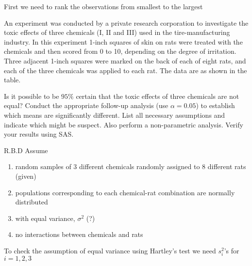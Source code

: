 \documentclass{article}
\begin{document}
First we need to rank the observations from smallest to the largest

An experiment was conducted by a private research corporation to investigate the toxic
effects of three chemicals (I, II and III) used in the tire-manufacturing industry. In this
experiment 1-inch squares of skin on rats were treated with the chemicals and then scored
from 0 to 10, depending on the degree of irritation. Three adjacent 1-inch squares were
marked on the back of each of eight rats, and each of the three chemicals was applied to
each rat. The data are as shown in the table. 

Is it possible to be $95\%$ certain that the toxic effects of three chemicals are not equal? Conduct
the appropriate follow-up analysis (use $\alpha = 0.05$) to establish which means are significantly
different. List all necessary assumptions and indicate which might be suspect. Also perform a
non-parametric analysis. Verify your results using SAS. 


R.B.D
Assume 
\begin{enumerate}[1)]
\item random samples of 3 different chemicals randomly assigned to 8 different rats (given)
\item populations corresponding to each chemical-rat combination are normally distributed
\item with equal variance, $\sigma^2$ (?)
\item no interactions between chemicals and rats
\end{enumerate}

To check the assumption of equal variance using Hartley's test we need $s_i^2$'s for $i = 1,2,3$
\end{document}
